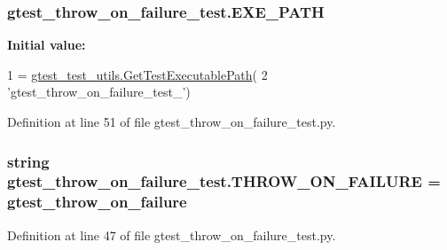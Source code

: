 \subsubsection[{\texorpdfstring{E\+X\+E\+\_\+\+P\+A\+TH}{EXE_PATH}}]{\setlength{\rightskip}{0pt plus 5cm}gtest\+\_\+throw\+\_\+on\+\_\+failure\+\_\+test.\+E\+X\+E\+\_\+\+P\+A\+TH}\hypertarget{namespacegtest__throw__on__failure__test_ac38dda23e362ecc76943073d173294f1}{}\label{namespacegtest__throw__on__failure__test_ac38dda23e362ecc76943073d173294f1}
{\bfseries Initial value\+:}
\begin{DoxyCode}
1 = \hyperlink{namespacegtest__test__utils_a89ed3717984a80ffbb7a9c92f71b86a2}{gtest\_test\_utils.GetTestExecutablePath}(
2     \textcolor{stringliteral}{'gtest\_throw\_on\_failure\_test\_'})
\end{DoxyCode}


Definition at line 51 of file gtest\+\_\+throw\+\_\+on\+\_\+failure\+\_\+test.\+py.

\subsubsection[{\texorpdfstring{T\+H\+R\+O\+W\+\_\+\+O\+N\+\_\+\+F\+A\+I\+L\+U\+RE}{THROW_ON_FAILURE}}]{\setlength{\rightskip}{0pt plus 5cm}string gtest\+\_\+throw\+\_\+on\+\_\+failure\+\_\+test.\+T\+H\+R\+O\+W\+\_\+\+O\+N\+\_\+\+F\+A\+I\+L\+U\+RE = \textquotesingle{}gtest\+\_\+throw\+\_\+on\+\_\+failure\textquotesingle{}}\hypertarget{namespacegtest__throw__on__failure__test_af837d05b7ed8498aed8202c1d83d1e7a}{}\label{namespacegtest__throw__on__failure__test_af837d05b7ed8498aed8202c1d83d1e7a}


Definition at line 47 of file gtest\+\_\+throw\+\_\+on\+\_\+failure\+\_\+test.\+py.

